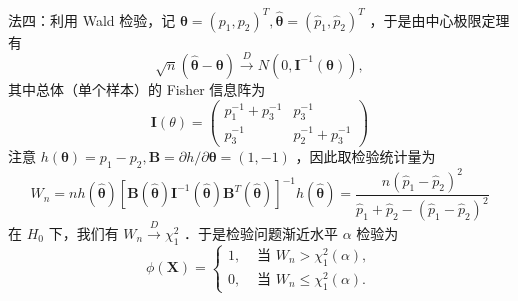 \documentclass[UTF8]{ctexart}
\begin{document}
法四：利用 Wald 检验，记 $\boldsymbol{\theta}=\left(p_1, p_2\right)^{T}, \hat{\boldsymbol{\theta}}=\left(\hat{p}_1, \hat{p}_2\right)^{T}$ ，于是由中心极限定理有
$$
\sqrt{n}(\hat{\boldsymbol{\theta}}-\boldsymbol{\theta}) \xrightarrow{D} N\left(0, \boldsymbol{I}^{-1}(\boldsymbol{\theta})\right),
$$
其中总体（单个样本）的 Fisher 信息阵为
$$
\boldsymbol{I}(\theta)=\left(\begin{array}{cc}
	p_1^{-1}+p_3^{-1} & p_3^{-1} \\
	p_3^{-1} & p_2^{-1}+p_3^{-1}
\end{array}\right)
$$
注意 $h(\boldsymbol{\theta})=p_1-p_2, \boldsymbol{B}=\partial h / \partial \boldsymbol{\theta}=(1,-1)$ ，因此取检验统计量为
$$
W_n=n h(\hat{\boldsymbol{\theta}})\left[\boldsymbol{B}(\hat{\boldsymbol{\theta}}) \boldsymbol{I}^{-1}(\hat{\boldsymbol{\theta}}) \boldsymbol{B}^{T}(\hat{\boldsymbol{\theta}})\right]^{-1} h(\hat{\boldsymbol{\theta}})=\frac{n\left(\hat{p}_1-\hat{p}_2\right)^2}{\hat{p}_1+\hat{p}_2-\left(\hat{p}_1-\hat{p}_2\right)^2}
$$
在 $H_0$ 下，我们有 $W_n \xrightarrow{D} \chi_1^2$ ．于是检验问题渐近水平 $\alpha$ 检验为
$$
\phi(\boldsymbol{X})= \begin{cases}1, & \text { 当 } W_n>\chi_1^2(\alpha), \\ 0, & \text { 当 } W_n \leq \chi_1^2(\alpha) .\end{cases}
$$\\
\end{document}
